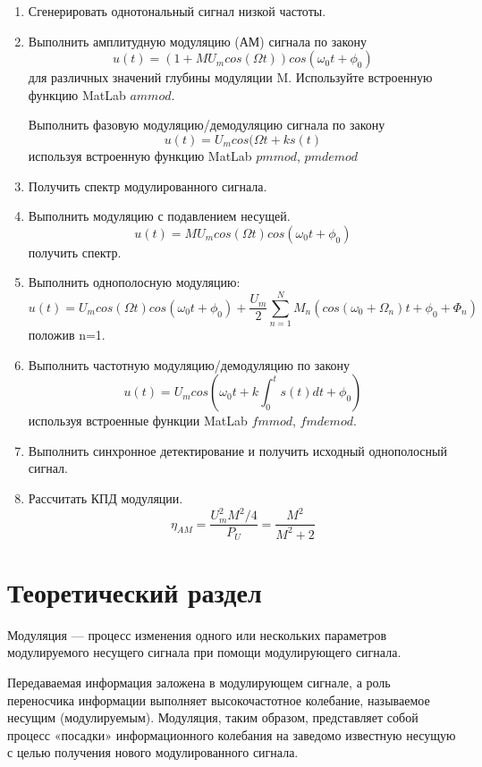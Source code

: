 \documentclass[a4paper,14pt]{extarticle}
\begin{document}
\begin{enumerate}
\item Сгенерировать однотональный сигнал низкой частоты.

\item Выполнить амплитудную модуляцию (АМ) сигнала по закону
$$ u(t) = (1 + MU_m cos(\Omega t)) cos(\omega_0 t + \phi_0)$$
для различных значений глубины модуляции M. Используйте встроенную функцию MatLab $ammod$.

Выполнить фазовую модуляцию/демодуляцию сигнала по закону 
$$ u(t) = U_m cos(\Omega t + ks(t)$$
используя встроенную функцию MatLab $pmmod$, $pmdemod$

\item Получить спектр модулированного сигнала.

\item Выполнить модуляцию с подавлением несущей.
$$ u(t) = MU_m cos(\Omega t) cos(\omega_0 t + \phi_0)$$
получить спектр.
\item Выполнить однополосную модуляцию:
$$\displaystyle u(t) = U_m cos(\Omega t) cos(\omega_0 t + \phi_0) + \frac{U_m}{2} \sum^N_{n=1}M_n(cos(\omega_0 + \Omega_n) t + \phi_0 + \Phi_n)$$
положив n=1.

\item Выполнить частотную модуляцию/демодуляцию по закону
$$\displaystyle u(t) = U_m cos(\omega_0 t + k \int_0^t s(t)dt + \phi_0)$$
используя встроенные функции MatLab $fmmod$, $fmdemod$.

\item Выполнить синхронное детектирование и получить исходный
однополосный сигнал.

\item Рассчитать КПД модуляции.
$$\displaystyle \eta_{AM} = \frac{U^2_m M^2/4}{P_U} = \frac{M^2}{M^2 + 2}$$
\end{enumerate}

\section{Теоретический раздел}

Модуляция — процесс изменения одного или нескольких параметров модулируемого несущего сигнала при помощи модулирующего сигнала.

Передаваемая информация заложена в модулирующем сигнале, а роль переносчика информации выполняет высокочастотное колебание, называемое несущим (модулируемым). Модуляция, таким образом, представляет собой процесс «посадки» информационного колебания на заведомо известную несущую с целью получения нового модулированного сигнала.
\end{document}
